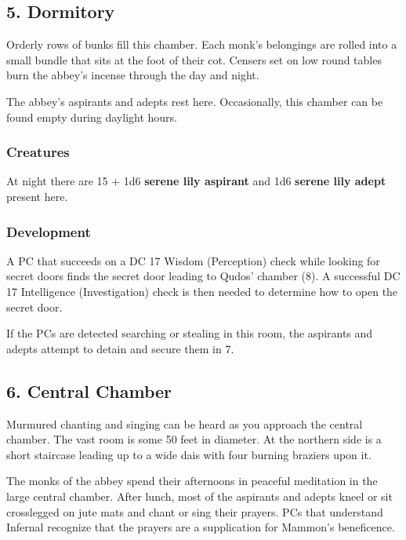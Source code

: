 \documentclass[10pt,a4paper,twoside,bg=print,twocolumn,openany,nodeprecatedcode]{dndbook}
\begin{document}
\subsection{5. Dormitory}
\begin{DndReadAloud}{}
Orderly rows of bunks fill this chamber. Each monk's belongings are rolled into a small bundle that sits at the foot of their cot. Censers set on low round tables burn the abbey's incense through the day and night.

\end{DndReadAloud}

The abbey's aspirants and adepts rest here. Occasionally, this chamber can be found empty during daylight hours.

\subsubsection{Creatures}
At night there are 15 + 1d6 \textbf{serene lily aspirant} and 1d6 \textbf{serene lily adept} present here.

\subsubsection{Development}
A PC that succeeds on a DC 17 Wisdom (Perception) check while looking for secret doors finds the secret door leading to Qudos' chamber (8). A successful DC 17 Intelligence (Investigation) check is then needed to determine how to open the secret door.

If the PCs are detected searching or stealing in this room, the aspirants and adepts attempt to detain and secure them in 7.

\subsection{6. Central Chamber}
\begin{DndReadAloud}{}
Murmured chanting and singing can be heard as you approach the central chamber. The vast room is some 50 feet in diameter. At the northern side is a short staircase leading up to a wide dais with four burning braziers upon it.

\end{DndReadAloud}

The monks of the abbey spend their afternoons in peaceful meditation in the large central chamber. After lunch, most of the aspirants and adepts kneel or sit crosslegged on jute mats and chant or sing their prayers. PCs that understand Infernal recognize that the prayers are a supplication for Mammon's beneficence.
\end{document}
